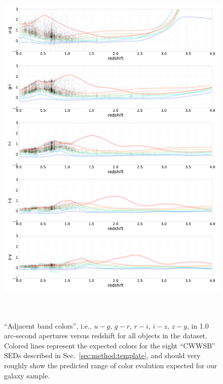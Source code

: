 \begin{figure}
    \centering
    \includegraphics[height=7in]{figures/color_v_redshift.pdf}
    \caption{``Adjacent band colors'', i.e., $u-g$, $g-r$, $r-i$, $i-z$, $z-y$, in 1.0 arc-second apertures versus redshift for all objects in the  dataset.  Colored lines represent the expected colors for the eight ``CWWSB'' SEDs described in Sec.~\ref{sec:method:template}, and should very roughly show the predicted range of color evolution expected for our galaxy sample.}
    \label{fig:dp_color_v_redshift}
\end{figure}

